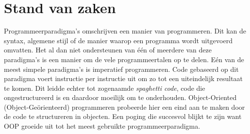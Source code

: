 \chapter{Stand van zaken}
\label{ch:stand-van-zaken}






Programmeerparadigma's omschrijven een manier van programmeren. Dit kan de syntax, algemene stijl of de manier waarop een programma wordt uitgevoerd omvatten. Het al dan niet ondersteunen van één of meerdere van deze paradigma's is een manier om de vele programmeertalen op te delen. Eén van de meest simpele paradigma's is imperatief programmeren. Code gebaseerd op dit paradigma voert instructie per instructie uit om zo tot een uiteindelijk resultaat te komen. Dit leidde echter tot zogenaamde \textit{spaghetti code}, code die ongestructureerd is en daardoor moeilijk om te onderhouden. Object-Oriented (Object-Geörienteerd) programmeren probeerde hier een eind aan te maken door de code te structureren in objecten. Een poging die succesvol blijkt te zijn want OOP groeide uit tot het meest gebruikte programmeerparadigma. 

